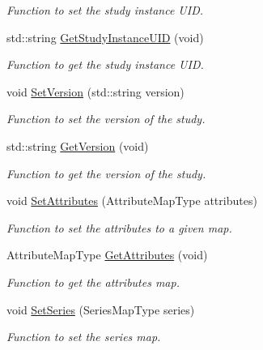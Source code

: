 \begin{DoxyCompactItemize}
\begin{DoxyCompactList}\small\item\em Function to set the study instance UID. \item\end{DoxyCompactList}\item 
std::string \hyperlink{class_study_a2dd55074d91e732627f2cf6c20877837}{GetStudyInstanceUID} (void)
\begin{DoxyCompactList}\small\item\em Function to get the study instance UID. \item\end{DoxyCompactList}\item 
void \hyperlink{class_study_a9aee71c49a1f5a0b3970a5a7fcfebef3}{SetVersion} (std::string version)
\begin{DoxyCompactList}\small\item\em Function to set the version of the study. \item\end{DoxyCompactList}\item 
std::string \hyperlink{class_study_a3189a0bcd3ae8bb6d27e9243604f0a5d}{GetVersion} (void)
\begin{DoxyCompactList}\small\item\em Function to get the version of the study. \item\end{DoxyCompactList}\item 
void \hyperlink{class_study_a56e83863d750f0dacc1b21b18b5ca786}{SetAttributes} (AttributeMapType attributes)
\begin{DoxyCompactList}\small\item\em Function to set the attributes to a given map. \item\end{DoxyCompactList}\item 
AttributeMapType \hyperlink{class_study_aa9e4971ca1fc5a76a5d63a70964a8b7e}{GetAttributes} (void)
\begin{DoxyCompactList}\small\item\em Function to get the attributes map. \item\end{DoxyCompactList}\item 
void \hyperlink{class_study_aad4bfc77ec8d50da4e2c4fc2b8ce5e7b}{SetSeries} (SeriesMapType series)
\begin{DoxyCompactList}\small\item\em Function to set the series map. \item\end{DoxyCompactList}\item 

\end{DoxyCompactItemize}
